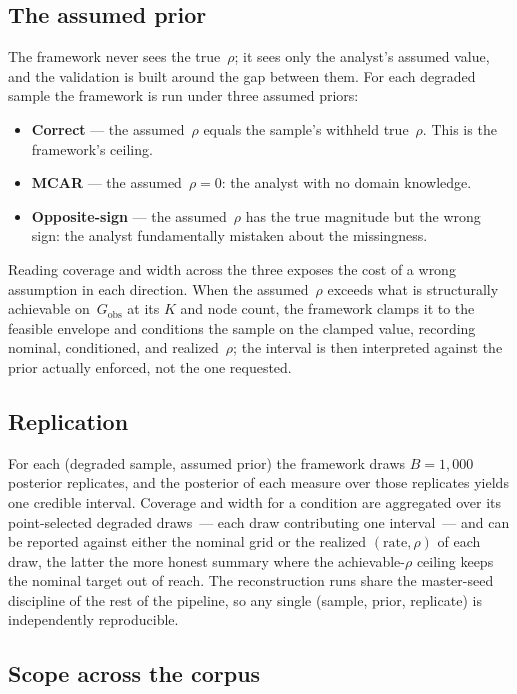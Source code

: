 \documentclass[11pt]{article}
\newcommand{\Gobs}{G_{\text{obs}}}
\begin{document}
\subsection{The assumed prior}

The framework never sees the true~$\rho$; it sees only the analyst's assumed value, and the validation is built around the gap between them. For each degraded sample the framework is run under three assumed priors:
\begin{itemize}[leftmargin=*, itemsep=3pt]
  \item \textbf{Correct} --- the assumed~$\rho$ equals the sample's withheld true~$\rho$. This is the framework's ceiling.
  \item \textbf{MCAR} --- the assumed~$\rho = 0$: the analyst with no domain knowledge.
  \item \textbf{Opposite-sign} --- the assumed~$\rho$ has the true magnitude but the wrong sign: the analyst fundamentally mistaken about the missingness.
\end{itemize}
Reading coverage and width across the three exposes the cost of a wrong assumption in each direction. When the assumed~$\rho$ exceeds what is structurally achievable on~$\Gobs$ at its $K$ and node count, the framework clamps it to the feasible envelope and conditions the sample on the clamped value, recording nominal, conditioned, and realized~$\rho$; the interval is then interpreted against the prior actually enforced, not the one requested.

\subsection{Replication}

For each (degraded sample, assumed prior) the framework draws $B = 1{,}000$ posterior replicates, and the posterior of each measure over those replicates yields one credible interval. Coverage and width for a condition are aggregated over its point-selected degraded draws~--- each draw contributing one interval~--- and can be reported against either the nominal grid or the realized $(\text{rate}, \rho)$ of each draw, the latter the more honest summary where the achievable-$\rho$ ceiling keeps the nominal target out of reach. The reconstruction runs share the master-seed discipline of the rest of the pipeline, so any single (sample, prior, replicate) is independently reproducible.

\subsection{Scope across the corpus}
\end{document}
